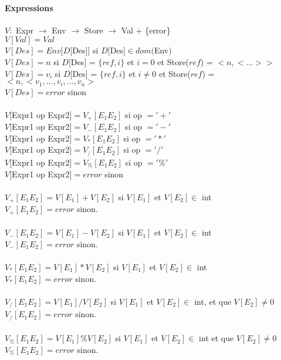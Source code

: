 \paragraph{Expressions} $V:$ Expr $\rightarrow$ Env $\rightarrow$ Store $\rightarrow$ Val + \{error\}\\
$V[Val] = Val$\\
$V[Des] = Env[D[$Des$]]$ si $D[$Des$] \in dom($Env$)$ \\
$V[Des] = n $ si $D[$Des$]$ = $\{ref,i\}$ et $i = 0$ et Store($ref$) = $<n,<...>>$ \\
$V[Des] = v_i$ si $D[$Des$]$ = $\{ref,i\}$ et $i \neq 0$ et Store($ref$) = $<n,<v_1,...,v_i,...,v_{n}>$\\
$V[Des] = error $ sinon\\
\\
$V[$Expr1 op Expr2$] = V_+[E_1 E_2] $ si op $= '+'$\\
$V[$Expr1 op Expr2$] = V_-[E_1 E_2] $ si op $= '-'$\\
$V[$Expr1 op Expr2$] = V_*[E_1 E_2] $ si op $= '*'$\\
$V[$Expr1 op Expr2$] = V_/[E_1 E_2] $ si op $= '/'$\\
$V[$Expr1 op Expr2$] = V_\%[E_1 E_2] $ si op $= '\%'$\\
$V[$Expr1 op Expr2$] = error$ sinon\\
\\
$V_+[E_1 E_2] = V[E_1] + V[E_2]$ si $V[E_1]$ et $V[E_2] \in$ int \\
$V_+[E_1 E_2] = error$ sinon.\\
\\
$V_-[E_1 E_2] = V[E_1] - V[E_2]$ si $V[E_1]$ et $V[E_2] \in$ int \\
$V_-[E_1 E_2] = error$ sinon.\\
\\
$V_*[E_1 E_2] = V[E_1] * V[E_2]$ si $V[E_1]$ et $V[E_2] \in$ int \\
$V_*[E_1 E_2] = error$ sinon.\\
\\
$V_/[E_1 E_2] = V[E_1] / V[E_2]$ si $V[E_1]$ et $V[E_2] \in$ int, et que  $V[E_2] \neq 0$\\
$V_/[E_1 E_2] = error$ sinon.\\
\\
$V_\%[E_1 E_2] = V[E_1] \% V[E_2]$ si $V[E_1]$ et $V[E_2] \in$ int et que $V[E_2] \neq 0$\\
$V_\%[E_1 E_2] = error$ sinon.\\
\\

